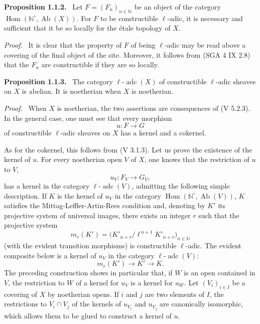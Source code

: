 \documentclass[11pt]{article}
\newenvironment{statement}[1]{\par\medskip\noindent\textbf{#1.}\ }{\par\medskip}
\newenvironment{prooftext}[1][Proof]{\par\noindent\emph{#1.}\ }{\par\medskip}
\DeclareMathOperator{\Hom}{Hom}
\providecommand{\Hom}{\operatorname{Hom}}
\providecommand{\Ab}{\operatorname{Ab}}
\providecommand{\adc}{\operatorname{adc}}
\providecommand{\Ab}{\operatorname{Ab}}
\providecommand{\Hom}{\operatorname{Hom}}
\begin{document}
\begin{statement}{Proposition 1.1.2}
Let \(F=(F_n)_{n\in\mathbb N}\) be an object of the category \(\Hom(\mathbb N^\circ,\Ab(X))\). For \(F\) to be constructible \(\ell\)-adic, it is necessary and sufficient that it be so locally for the étale topology of \(X\).
\end{statement}

\begin{prooftext}[Proof]
It is clear that the property of \(F\) of being \(\ell\)-adic may be read above a covering of the final object of the site. Moreover, it follows from (SGA 4 IX 2.8) that the \(F_n\) are constructible if they are so locally.
\end{prooftext}

\begin{statement}{Proposition 1.1.3}
The category \(\ell\text{-}\adc(X)\) of constructible \(\ell\)-adic sheaves on \(X\) is abelian. It is noetherian when \(X\) is noetherian.
\end{statement}

\begin{prooftext}[Proof]
When \(X\) is noetherian, the two assertions are consequences of (V 5.2.3). In the general case, one must see that every morphism
\[
u:F\longrightarrow G
\]
of constructible \(\ell\)-adic sheaves on \(X\) has a kernel and a cokernel.

As for the cokernel, this follows from (V 3.1.3). Let us prove the existence of the kernel of \(u\). For every noetherian open \(V\) of \(X\), one knows that the restriction of \(u\) to \(V\),
\[
u_V:F_V\longrightarrow G_V,
\]
has a kernel in the category \(\ell\text{-}\adc(V)\), admitting the following simple description. If \(K\) is the kernel of \(u_V\) in the category \(\Hom(\mathbb N^\circ,\Ab(V))\), \(K\) satisfies the Mittag-Leffler-Artin-Rees condition and, denoting by \(K'\) its projective system of universal images, there exists an integer \(r\) such that the projective system
\[
m_r(K')=\bigl(K'_{n+r}/\ell^{\,n+1}K'_{n+r}\bigr)_{n\in\mathbb N}
\]
(with the evident transition morphisms) is constructible \(\ell\)-adic. The evident composite below is a kernel of \(u_V\) in the category \(\ell\text{-}\adc(V)\):
\[
m_r(K')\longrightarrow K'\longrightarrow K.
\]
The preceding construction shows in particular that, if \(W\) is an open contained in \(V\), the restriction to \(W\) of a kernel for \(u_V\) is a kernel for \(u_W\). Let \((V_i)_{i\in I}\) be a covering of \(X\) by noetherian opens. If \(i\) and \(j\) are two elements of \(I\), the restrictions to \(V_i\cap V_j\) of the kernels of \(u_{V_i}\) and \(u_{V_j}\) are canonically isomorphic, which allows them to be glued to construct a kernel of \(u\).
\end{prooftext}
\end{document}
